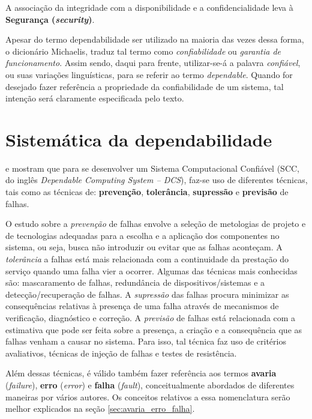 A associação da integridade com a disponibilidade e a confidencialidade leva à
\textbf{Segurança (\textit{security})}.

Apesar do termo dependabilidade ser utilizado na maioria das vezes dessa forma,
o dicionário Michaelis, traduz tal termo como {\it confiabilidade} ou {\it
garantia de funcionamento}. Assim sendo, daqui para frente, utilizar-se-á a
palavra {\it confiável}, ou suas variações linguísticas, para se referir ao
termo {\it dependable}. Quando for desejado fazer referência a propriedade da
confiabilidade de um sistema, tal intenção será claramente especificada pelo
texto.

\section{Sistemática da dependabilidade}
 e  mostram que para se
desenvolver um Sistema Computacional Confiável (SCC, do inglês {\it Dependable
Computing System -- DCS}), faz-se uso de diferentes técnicas, tais como as
técnicas de: {\bf prevenção}, {\bf tolerância}, {\bf supressão} e {\bf previsão}
de falhas.

O estudo sobre a {\it prevenção} de falhas envolve a seleção de metologias de
projeto e de tecnologias adequadas para a escolha e a aplicação dos componentes
no sistema, ou seja, busca não introduzir ou evitar que as falhas aconteçam. A
{\it tolerância} a falhas está mais relacionada com a continuidade da prestação
do serviço quando uma falha vier a ocorrer. Algumas das técnicas mais conhecidas
são: mascaramento de falhas, redundância de dispositivos/sistemas e a
detecção/recuperação de falhas. A {\it supressão} das falhas procura minimizar
as consequências relativas à presença de uma falha através de mecanismos de
verificação, diagnóstico e correção. A {\it previsão} de falhas está relacionada
com a estimativa que pode ser feita sobre a presença, a criação e a consequência
que as falhas venham a causar no sistema. Para isso, tal técnica faz uso de
critérios avaliativos, técnicas de injeção de falhas e testes de resistência.

Além dessas técnicas, é válido também fazer referência aos termos {\bf avaria}
({\it failure}), {\bf erro} ({\it error}) e {\bf falha} ({\it fault}),
conceitualmente abordados de diferentes maneiras por vários autores. Os
conceitos relativos a essa nomenclatura serão melhor explicados na seção
\ref{sec:avaria_erro_falha}.

